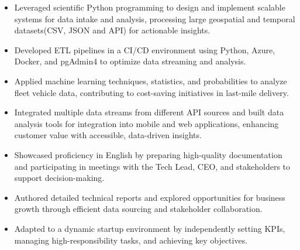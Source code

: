 \documentclass[10pt,a4paper,ragged2e,withhyper]{altacv}
\begin{document}
\begin{paracol}{2}


\begin{itemize}
    \item Leveraged scientific Python programming to design and implement scalable systems for data intake and analysis, processing large geospatial and temporal datasets(CSV, JSON and API) for actionable insights.
    \item Developed ETL pipelines in a CI/CD environment using Python, Azure, Docker, and pgAdmin4 to optimize data streaming and analysis.
    \item Applied machine learning techniques, statistics, and probabilities to analyze fleet vehicle data, contributing to cost-saving initiatives in last-mile delivery.
    \item Integrated multiple data streams from different API sources and built data analysis tools for integration into mobile and web applications, enhancing customer value with accessible, data-driven insights.
    \item Showcased proficiency in English by preparing high-quality documentation and participating in meetings with the Tech Lead, CEO, and stakeholders to support decision-making.
    \item Authored detailed technical reports and explored opportunities for business growth through efficient data sourcing and stakeholder collaboration.
    \item Adapted to a dynamic startup environment by independently setting KPIs, managing high-responsibility tasks, and achieving key objectives.

\end{itemize}


\end{paracol}
\end{document}
